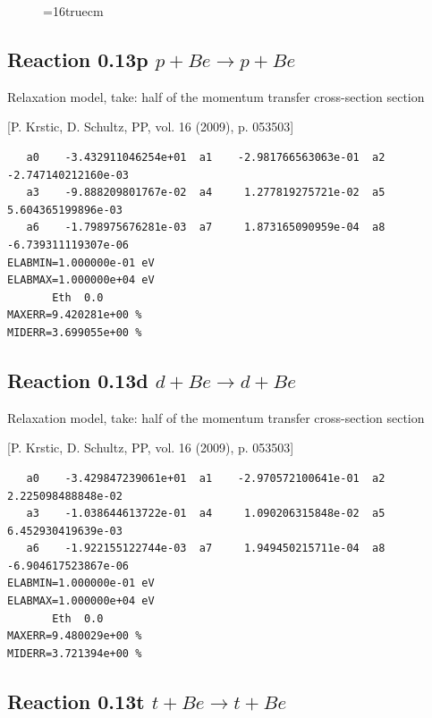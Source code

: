 \documentclass[12pt,dvipdfmx]{article}
\begin{document}
\begin{figure} \label{0.8}
\epsfxsize=16truecm
\end{figure}
\newpage

\subsection{
Reaction 0.13p   $ p + Be \rightarrow p + Be $
}

Relaxation model, take: half of the momentum transfer cross-section
section

[P. Krstic, D. Schultz, PP, vol. 16 (2009), p. 053503]

\begin{small}\begin{verbatim}
   a0    -3.432911046254e+01  a1    -2.981766563063e-01  a2    -2.747140212160e-03
   a3    -9.888209801767e-02  a4     1.277819275721e-02  a5     5.604365199896e-03
   a6    -1.798975676281e-03  a7     1.873165090959e-04  a8    -6.739311119307e-06
ELABMIN=1.000000e-01 eV
ELABMAX=1.000000e+04 eV
       Eth  0.0
MAXERR=9.420281e+00 %
MIDERR=3.699055e+00 %
\end{verbatim}\end{small}

\subsection{
Reaction 0.13d   $ d + Be \rightarrow d + Be $
}

Relaxation model, take: half of the momentum transfer cross-section
section

[P. Krstic, D. Schultz, PP, vol. 16 (2009), p. 053503]

\begin{small}\begin{verbatim}
   a0    -3.429847239061e+01  a1    -2.970572100641e-01  a2     2.225098488848e-02
   a3    -1.038644613722e-01  a4     1.090206315848e-02  a5     6.452930419639e-03
   a6    -1.922155122744e-03  a7     1.949450215711e-04  a8    -6.904617523867e-06
ELABMIN=1.000000e-01 eV
ELABMAX=1.000000e+04 eV
       Eth  0.0
MAXERR=9.480029e+00 %
MIDERR=3.721394e+00 %
\end{verbatim}\end{small}

\subsection{
Reaction 0.13t   $ t + Be \rightarrow t + Be $
}
\end{document}
